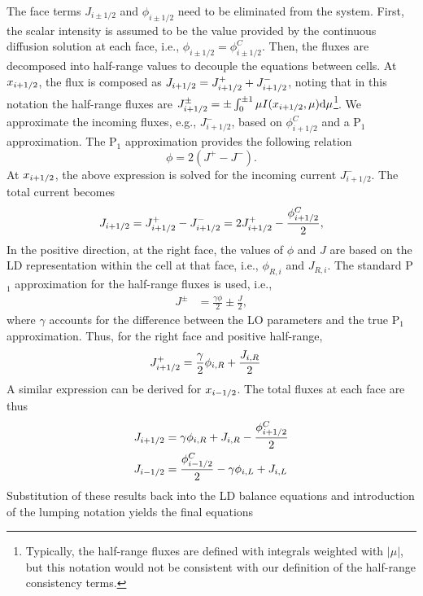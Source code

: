 The face terms $J_{i\pm 1/2}$ and $\phi_{i\pm 1/2}$ need to be eliminated from the
system. First, the scalar intensity is assumed to be the value provided by the continuous
diffusion solution at each face, i.e., $\phi_{i\pm1/2} = \phi_{i\pm1/2}^C$.
Then, the fluxes are decomposed into half-range values to decouple the equations
between cells.  At $x_{{i+1/2}}$, the flux is composed as $J_{i+1/2} = J_{{i+1/2}}^+ + J_{{i+1/2}}^-$,
noting that in this notation the half-range fluxes are $J_{{i+1/2}}^{\pm}=\pm \int_{0}^{\pm  1}
\mu I(x_{i+1/2},\mu) \mathrm{d} \mu$\footnote{Typically, the half-range fluxes are defined with
    integrals weighted with $| \mu |$, but this notation would not be consistent with our
definition of the half-range consistency terms.}.  We approximate the incoming fluxes, e.g.,
$J_{i+1/2}^-$, based on $\phi_{i+1/2}^C$ and a P$_1$ approximation.   
The P$_1$ approximation provides the following relation~\cite{wla_thesis}
\begin{equation}
    \phi = 2(J^+ - J^-).
\end{equation}
At ${x_{i+1/2}}$, the above expression is solved for the incoming current $J_{i+1/2}^-$.  The
total current becomes
\begin{equation}\label{eq:jelim}
    J_{{i+1/2}} = J_{{i+1/2}}^+ - J_{{i+1/2}}^- = 2J_{{i+1/2}}^+ - \frac{\phi_{i+1/2}^C}{2},
\end{equation}
In the positive direction, at the right face, the
values of $\phi$ and $J$ are based on the LD representation within the cell at that
face, i.e., $\phi_{R,i}$ and $J_{R,i}$.  The standard P$_1$ approximation for the
half-range fluxes is used\cite{stacy}, i.e.,
\begin{align}
    J^{\pm} &= \frac{\gamma \phi}{2} \pm \frac{J}{2},
\end{align}
where $\gamma$ accounts for the difference between the LO parameters and the true
P$_1$ approximation. Thus, for the right face and positive half-range,
\begin{align}
    J_{{i+1/2}}^+ &= \frac{\gamma}{2}\phi_{i,R} + \frac{J_{i,R}}{2} 
\end{align}
A similar expression can be derived for ${x_{i-1/2}}$.  The total fluxes at each face are
thus
\begin{align}
    J_{i+1/2} &= \gamma\phi_{i,R} + J_{i,R} - \frac{\phi_{{i+1/2}}^C}{2} \\
    J_{i-1/2} &= \frac{\phi_{i-1/2}^C}{2} - \gamma \phi_{i,L} + J_{i,L}
\end{align}
Substitution of these results back into the LD balance equations and introduction of the
lumping notation yields the final equations 

